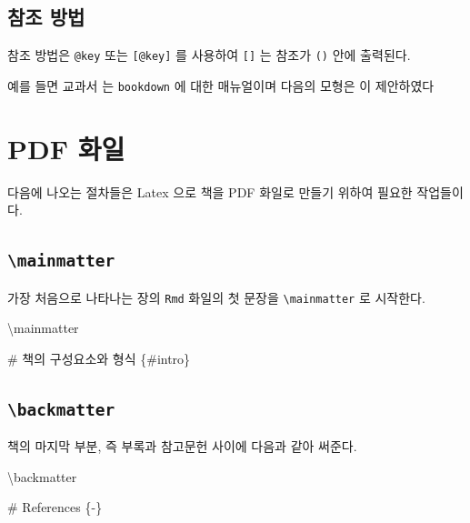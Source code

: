 \documentclass[
]{book}
\newenvironment{Shaded}{\begin{snugshade}}{\end{snugshade}}
\newcommand{\FunctionTok}[1]{\textcolor[rgb]{0.00,0.00,0.00}{#1}}
\newcommand{\NormalTok}[1]{#1}
\theoremstyle{definition}
\theoremstyle{definition}
\theoremstyle{definition}
\theoremstyle{definition}
\theoremstyle{remark}
\begin{document}
\hypertarget{uxcc38uxc870-uxbc29uxbc95}{%
\subsection{참조 방법}\label{uxcc38uxc870-uxbc29uxbc95}}

참조 방법은 \texttt{@key} 또는 \texttt{{[}@key{]}} 를 사용하여 \texttt{{[}{]}} 는 참조가 \texttt{()} 안에 출력된다.

예를 들면 교과서 \citet{xie2015} 는 \texttt{bookdown} 에 대한 매뉴얼이며 다음의 모형은 \citet{battese1988error} 이 제안하였다 \citep{royall1970finite}

\hypertarget{pdf-uxd654uxc77c}{%
\section{PDF 화일}\label{pdf-uxd654uxc77c}}

다음에 나오는 절차들은 Latex 으로 책을 PDF 화일로 만들기 위하여 필요한 작업들이다.

\hypertarget{mainmatter}{%
\subsection{\texorpdfstring{\texttt{\textbackslash{}mainmatter}}{\textbackslash mainmatter}}\label{mainmatter}}

가장 처음으로 나타나는 장의 \texttt{Rmd} 화일의 첫 문장을 \texttt{\textbackslash{}mainmatter} 로 시작한다.

\begin{Shaded}
\begin{Highlighting}[]
\NormalTok{\textbackslash{}mainmatter}

\FunctionTok{\# 책의 구성요소와 형식 \{\#intro\}}
\end{Highlighting}
\end{Shaded}

\hypertarget{backmatter}{%
\subsection{\texorpdfstring{\texttt{\textbackslash{}backmatter}}{\textbackslash backmatter}}\label{backmatter}}

책의 마지막 부분, 즉 부록과 참고문헌 사이에 다음과 같아 써준다.

\begin{Shaded}
\begin{Highlighting}[]
\NormalTok{\textbackslash{}backmatter}

\FunctionTok{\# References \{{-}\}}
\end{Highlighting}
\end{Shaded}
\end{document}
